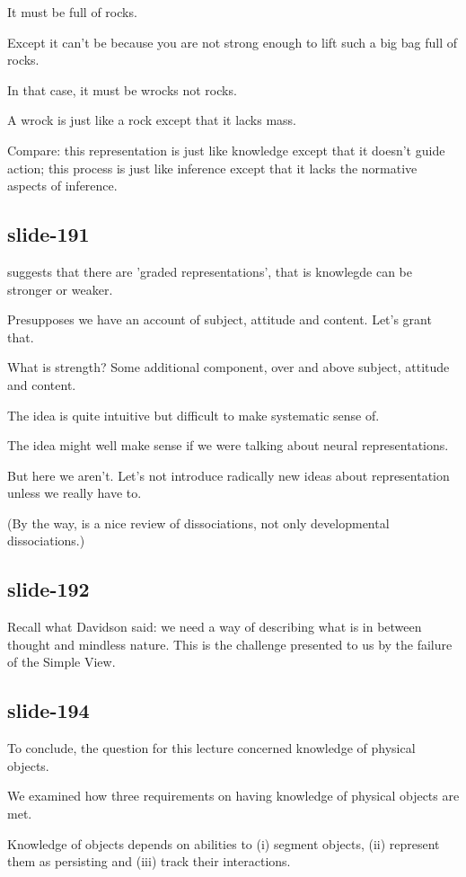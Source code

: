 \documentclass[12pt,\papersize]{extarticle}
\begin{document}
It must be full of rocks.
 
Except it can't be because you are not strong enough to lift such a big bag full of rocks.
 
In that case, it must be wrocks not rocks.
 
A wrock is just like a rock except that it lacks mass.
 
Compare: this representation is just like knowledge except that it doesn't guide action; this process is just like inference except that it lacks the normative aspects of inference.
 
\subsection{slide-191}
\citet{Munakata:2001ch} suggests that there are 'graded representations', that is knowlegde can be stronger or weaker.
 
Presupposes we have an account of subject, attitude and content.  Let's grant that.
 
What is strength?  Some additional component, over and above subject, attitude and content.
 
The idea is quite intuitive but difficult to make systematic sense of.
 
The idea might well make sense if we were talking about neural representations.
 
But here we aren't.  Let's not introduce radically new ideas about representation unless we really have to.
 
(By the way, \citet{Munakata:2001ch} is a nice review of dissociations, not only developmental dissociations.)
 
\subsection{slide-192}
Recall what Davidson said: we need a way of describing what is in between thought and 
mindless nature.  This is the challenge presented to us by the failure of the Simple View.
 
 
\subsection{slide-194}
To conclude, the question for this lecture concerned knowledge of physical objects.
 
We examined how three requirements on having knowledge of physical objects are met.
 
Knowledge of objects depends on abilities to (i) segment objects, (ii) represent them as persisting and (iii) track their interactions.
 
\end{document}
